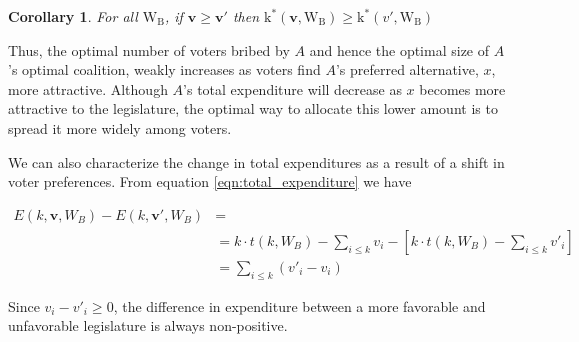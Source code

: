 \documentclass[12pt,a4paper]{article}
\newtheorem{corollary}{Corollary}
\begin{document}
\begin{corollary}
    \label{cor:change_k}
    For all $\mathrm{W_B}$, if $\mathbf{v} \geq \mathbf{v}'$ then $\mathrm{k}^*(\mathbf{v}, \mathrm{W_B}) \geq \mathrm{k}^*(v', \mathrm{W_B})$
\end{corollary}

Thus, the optimal number of voters bribed by $A$ and hence the optimal size of $A$'s optimal coalition, weakly increases as voters find $A$'s preferred alternative, $x$, more attractive. Although $A$'s total expenditure will decrease as $x$ becomes more attractive to the legislature, the optimal way to allocate this lower amount is to spread it more widely among voters.

We can also characterize the change in total expenditures as a result of a shift in voter preferences. From equation \ref{eqn:total_expenditure} we have

\begin{align*}
    E(k, \mathbf{v}, W_B) - E(k, \mathbf{v}', W_B) & = \\
    &= k \cdot t(k, W_B) - \sum_{i \leq k} v_i - \left[k \cdot t(k, W_B) - \sum_{i \leq k} v'_i\right]\\
    &= \sum_{i \leq k}(v'_i - v_i)
\end{align*}

Since $v_i - v'_i \geq 0$, the difference in expenditure between a more favorable and unfavorable legislature is always non-positive.
\end{document}

